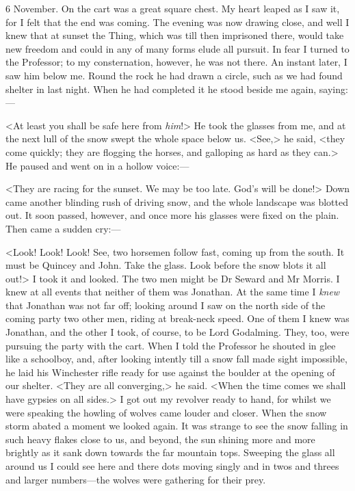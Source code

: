 \begin{diary}{6 November.}
On the cart was a great square chest. My heart leaped as I saw it, for I felt that the end was coming. The evening was now drawing close, and well I knew that at sunset the Thing, which was till then imprisoned there, would take new freedom and could in any of many forms elude all pursuit. In fear I turned to the Professor; to my consternation, however, he was not there. An instant later, I saw him below me. Round the rock he had drawn a circle, such as we had found shelter in last night. When he had completed it he stood beside me again, saying:—

<At least you shall be safe here from \textit{him}!> He took the glasses from me, and at the next lull of the snow swept the whole space below us. <See,> he said, <they come quickly; they are flogging the horses, and galloping as hard as they can.> He paused and went on in a hollow voice:—

<They are racing for the sunset. We may be too late. God's will be done!> Down came another blinding rush of driving snow, and the whole landscape was blotted out. It soon passed, however, and once more his glasses were fixed on the plain. Then came a sudden cry:—

<Look! Look! Look! See, two horsemen follow fast, coming up from the south. It must be Quincey and John. Take the glass. Look before the snow blots it all out!> I took it and looked. The two men might be Dr Seward and Mr Morris. I knew at all events that neither of them was Jonathan. At the same time I \textit{knew} that Jonathan was not far off; looking around I saw on the north side of the coming party two other men, riding at break-neck speed. One of them I knew was Jonathan, and the other I took, of course, to be Lord Godalming. They, too, were pursuing the party with the cart. When I told the Professor he shouted in glee like a schoolboy, and, after looking intently till a snow fall made sight impossible, he laid his Winchester rifle ready for use against the boulder at the opening of our shelter. <They are all converging,> he said. <When the time comes we shall have gypsies on all sides.> I got out my revolver ready to hand, for whilst we were speaking the howling of wolves came louder and closer. When the snow storm abated a moment we looked again. It was strange to see the snow falling in such heavy flakes close to us, and beyond, the sun shining more and more brightly as it sank down towards the far mountain tops. Sweeping the glass all around us I could see here and there dots moving singly and in twos and threes and larger numbers—the wolves were gathering for their prey.


\end{diary}
